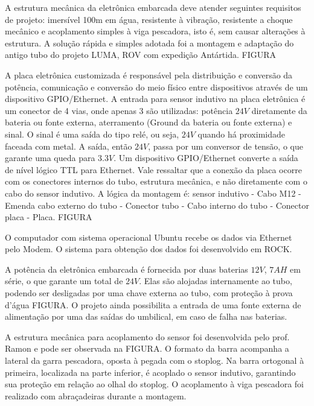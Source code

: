 A estrutura mecânica da eletrônica embarcada deve atender seguintes requisitos
de projeto: imersível 100m em água, resistente à vibração, resistente a choque
mecânico e acoplamento simples à viga pescadora, isto é, sem causar alterações à
estrutura. A solução rápida e simples adotada foi a montagem e adaptação do
antigo tubo do projeto LUMA, ROV com expedição Antártida. FIGURA

A placa eletrônica customizada é responsável pela distribuição e conversão da
potência, comunicação e conversão do meio físico entre dispositivos através de
um dispositivo GPIO/Ethernet. A entrada para sensor indutivo na placa eletrônica
é um conector de 4 vias, onde apenas 3 são utilizadas: potência $24V$
diretamente da bateria ou fonte externa, aterramento (Ground da bateria ou fonte
externa) e sinal. O sinal é uma saída do tipo relé, ou seja, $24V$ quando há
proximidade faceada com metal. A saída, então $24V$, passa por um conversor de
tensão, o que garante uma queda para $3.3V$. Um dispositivo GPIO/Ethernet
converte a saída de nível lógico TTL para Ethernet. Vale ressaltar que a
conexão da placa ocorre com os conectores internos do tubo, estrutura mecânica, e não diretamente com o cabo do sensor indutivo. A lógica da montagem é: sensor indutivo - Cabo
M12 - Emenda cabo externo do tubo - Conector tubo - Cabo interno do tubo -
Conector placa - Placa. FIGURA

O computador com sistema operacional Ubuntu recebe os dados via Ethernet pelo
Modem. O sistema para obtenção dos dados foi desenvolvido em ROCK.

A potência da eletrônica embarcada é fornecida por duas baterias $12V$, $7AH$ em
série, o que garante um total de $24V$. Elas são alojadas internamente ao tubo,
podendo ser desligadas por uma chave externa ao tubo, com proteção à prova
d'água FIGURA. O projeto ainda possibilita a entrada de uma fonte externa de
alimentação por uma das saídas do umbilical, em caso de falha nas baterias.

A estrutura mecânica para acoplamento do sensor foi desenvolvida pelo prof.
Ramon e pode ser observada na FIGURA. O formato da barra acompanha a lateral
da garra pescadora, oposta à pegada com o stoplog. Na barra ortogonal à
primeira, localizada na parte inferior, é acoplado o sensor indutivo, garantindo
sua proteção em relação ao olhal do stoplog. O acoplamento à viga pescadora foi
realizado com abraçadeiras durante a montagem.




\label{materials}




